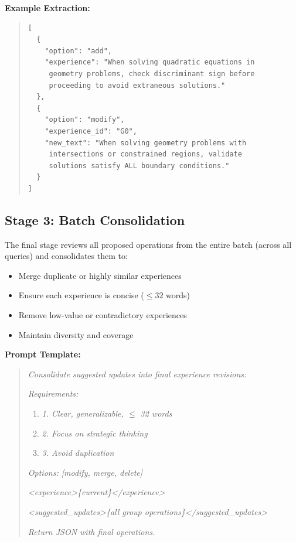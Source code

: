 \textbf{Example Extraction:}
\begin{quote}
\small
\begin{verbatim}
[
  {
    "option": "add",
    "experience": "When solving quadratic equations in
     geometry problems, check discriminant sign before
     proceeding to avoid extraneous solutions."
  },
  {
    "option": "modify",
    "experience_id": "G0",
    "new_text": "When solving geometry problems with
     intersections or constrained regions, validate
     solutions satisfy ALL boundary conditions."
  }
]
\end{verbatim}
\end{quote}

\subsection{Stage 3: Batch Consolidation}

The final stage reviews all proposed operations from the entire batch (across all queries) and consolidates them to:
\begin{itemize}
    \item Merge duplicate or highly similar experiences
    \item Ensure each experience is concise ($\leq 32$ words)
    \item Remove low-value or contradictory experiences
    \item Maintain diversity and coverage
\end{itemize}

\textbf{Prompt Template:}
\begin{quote}
\small
\textit{Consolidate suggested updates into final experience revisions:}

\textit{Requirements:}
\begin{enumerate}
    \item[] \textit{1. Clear, generalizable, $\leq$ 32 words}
    \item[] \textit{2. Focus on strategic thinking}
    \item[] \textit{3. Avoid duplication}
\end{enumerate}

\textit{Options: [modify, merge, delete]}

\textit{<experience>\{current\}</experience>}

\textit{<suggested\_updates>\{all group operations\}</suggested\_updates>}

\textit{Return JSON with final operations.}
\end{quote}

